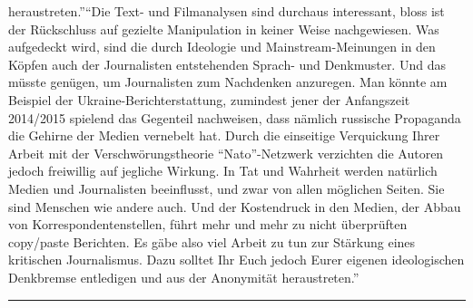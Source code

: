 {{{{heraustreten.''}}{``Die Text- und Filmanalysen sind durchaus interessant, bloss ist der Rückschluss auf gezielte Manipulation in keiner Weise nachgewiesen. Was aufgedeckt wird, sind die durch Ideologie und Mainstream-​Meinungen in den Köpfen auch der Journalisten entstehenden Sprach- und Denk­muster. Und das müsste genügen, um Journalisten zum Nachdenken anzuregen. Man könnte am Beispiel der Ukraine-​Bericht­erstattung, zumindest jener der Anfangs­zeit 2014/2015 spielend das Gegenteil nachweisen, dass nämlich russische Propaganda die Gehirne der Medien vernebelt hat. Durch die einseitige Verquickung Ihrer Arbeit mit der Verschwö­rungstheorie ``Nato''-​Netzwerk verzichten die Autoren jedoch freiwillig auf jegliche Wirkung. In Tat und Wahrheit werden natürlich Medien und Journalisten beeinflusst, und zwar von allen möglichen Seiten. Sie sind Menschen wie andere auch. Und der Kosten­druck in den Medien, der Abbau von Korres­pondenten­stellen, führt mehr und mehr zu nicht überprüften copy/paste Berichten. Es gäbe also viel Arbeit zu tun zur Stärkung eines kritischen Journalismus. Dazu solltet Ihr Euch jedoch Eurer eigenen ideologischen Denk­bremse entledigen und aus der Anonymität heraustreten.''}}\label{die-text--und-filmanalysen-sind-durchaus-interessant-bloss-ist-der-ruxfcckschluss-auf-gezielte-manipulation-in-keiner-weise-nachgewiesen-was-aufgedeckt-wird-sind-die-durch-ideologie-und-mainstream-meinungen-in-den-kuxf6pfen-auch-der-journalisten-entstehenden-sprach--und-denkmuster-und-das-muxfcsste-genuxfcgen-um-journalisten-zum-nachdenken-anzuregen-man-kuxf6nnte-am-beispiel-der-ukraine-berichterstattung-zumindest-jener-der-anfangszeit-20142015-spielend-das-gegenteil-nachweisen-dass-nuxe4mlich-russische-propaganda-die-gehirne-der-medien-vernebelt-hat-durch-die-einseitige-verquickung-ihrer-arbeit-mit-der-verschwuxf6rungstheorie-nato-netzwerk-verzichten-die-autoren-jedoch-freiwillig-auf-jegliche-wirkung-in-tat-und-wahrheit-werden-natuxfcrlich-medien-und-journalisten-beeinflusst-und-zwar-von-allen-muxf6glichen-seiten-sie-sind-menschen-wie-andere-auch-und-der-kostendruck-in-den-medien-der-abbau-von-korrespondentenstellen-fuxfchrt-mehr-und-mehr-zu-nicht-uxfcberpruxfcften-copypaste-berichten-es-guxe4be-also-viel-arbeit-zu-tun-zur-stuxe4rkung-eines-kritischen-journalismus-dazu-solltet-ihr-euch-jedoch-eurer-eigenen-ideologischen-denkbremse-entledigen-und-aus-der-anonymituxe4t-heraustreten}}

\begin{center}\rule{0.5\linewidth}{\linethickness}\end{center}

